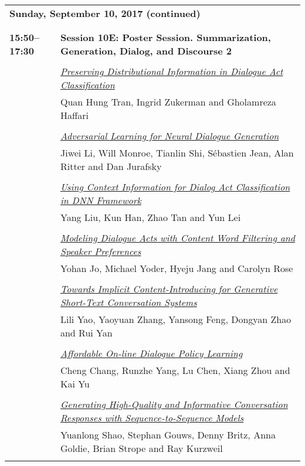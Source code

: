 \begin{tabular}{p{20mm}p{128mm}}
\\
\multicolumn{2}{l}{\bf Sunday, September 10, 2017 (continued)} \\\\
\\{\bf 15:50--17:30} & {\bf Session 10E: Poster Session. Summarization, Generation, Dialog, and Discourse 2 } \\
\\
 & \hyperlink{page.2134}{\em Preserving Distributional Information in Dialogue Act Classification}\\
         & Quan Hung Tran, Ingrid Zukerman and Gholamreza Haffari \\
\\

 & \hyperlink{page.2140}{\em Adversarial Learning for Neural Dialogue Generation}\\
         & Jiwei Li, Will Monroe, Tianlin Shi, S\'ebastien Jean, Alan Ritter and Dan Jurafsky \\
\\

 & \hyperlink{page.2153}{\em Using Context Information for Dialog Act Classification in DNN Framework}\\
         & Yang Liu, Kun Han, Zhao Tan and Yun Lei \\
\\

 & \hyperlink{page.2162}{\em Modeling Dialogue Acts with Content Word Filtering and Speaker Preferences}\\
         & Yohan Jo, Michael Yoder, Hyeju Jang and Carolyn Rose \\
\\

 & \hyperlink{page.2173}{\em Towards Implicit Content-Introducing for Generative Short-Text Conversation Systems}\\
         & Lili Yao, Yaoyuan Zhang, Yansong Feng, Dongyan Zhao and Rui Yan \\
\\

 & \hyperlink{page.2183}{\em Affordable On-line Dialogue Policy Learning}\\
         & Cheng Chang, Runzhe Yang, Lu Chen, Xiang Zhou and Kai Yu \\
\\

 & \hyperlink{page.2193}{\em Generating High-Quality and Informative Conversation Responses with Sequence-to-Sequence Models}\\
         & Yuanlong Shao, Stephan Gouws, Denny Britz, Anna Goldie, Brian Strope and Ray Kurzweil \\
\\


\end{tabular}
